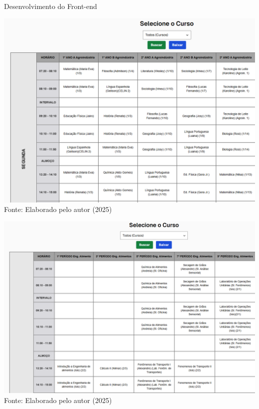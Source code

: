 \begin{frame}{Desenvolvimento do Front-end}
    \begin{minipage}{0.48\textwidth}
        \centering
        \includegraphics[width=1\textwidth]{figuras/front-3.png}
        \footnotesize Fonte: Elaborado pelo autor (2025)
    \end{minipage}
    \hfill
    \begin{minipage}{0.48\textwidth}
        \centering
        \includegraphics[width=1\textwidth]{figuras/front-4.png}
        \footnotesize Fonte: Elaborado pelo autor (2025)
    \end{minipage}
\end{frame}

